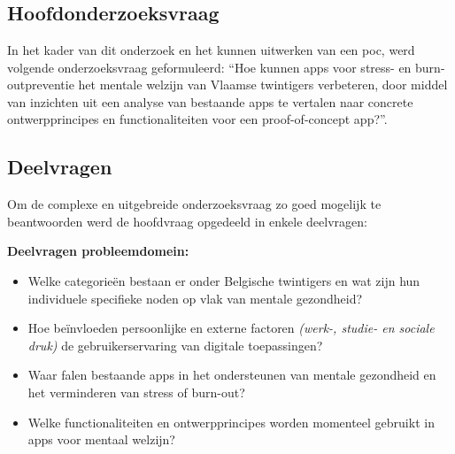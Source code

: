 \newpage

\section{}%
\label{sec:onderzoeksvraag}

\subsection{Hoofdonderzoeksvraag}
\label{subsec:hoofdonderzoeksvraag}

\vspace{1em}

In het kader van dit onderzoek en het kunnen uitwerken van een \acrshort{poc}, werd volgende onderzoeksvraag geformuleerd: “Hoe kunnen apps voor stress- en burn-outpreventie het mentale welzijn van Vlaamse twintigers verbeteren, door middel van inzichten uit een analyse van bestaande apps te vertalen naar concrete ontwerpprincipes en functionaliteiten voor een proof-of-concept app?”.

\subsection{Deelvragen}
\label{subsec:deelvragen}

\vspace{1em}

Om de complexe en uitgebreide onderzoeksvraag zo goed mogelijk te beantwoorden werd de hoofdvraag opgedeeld in enkele deelvragen:

\vspace{1em}
\vspace{1em}

\textbf{Deelvragen probleemdomein:}

\begin{itemize}
    \item Welke categorieën bestaan er onder Belgische twintigers en wat zijn hun individuele specifieke noden op vlak van mentale gezondheid?
    \item Hoe beïnvloeden persoonlijke en externe factoren \textit{(werk-, studie- en sociale druk)} de gebruikerservaring van digitale toepassingen?
    \item Waar falen bestaande apps in het ondersteunen van mentale gezondheid en het verminderen van stress of burn-out?
    \item Welke functionaliteiten en ontwerpprincipes worden momenteel gebruikt in apps voor mentaal welzijn?
\end{itemize}

